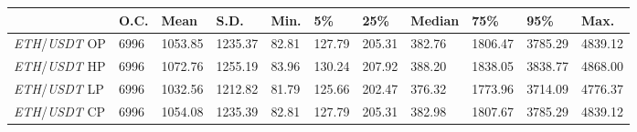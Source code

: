 \begin{tabular}{lllllllllll}
\toprule
 & \textbf{O.C.} & \textbf{Mean} & \textbf{S.D.} & \textbf{Min.} & \textbf{5\%} & \textbf{25\%} & \textbf{Median} & \textbf{75\%} & \textbf{95\%} & \textbf{Max.} \\
\midrule
\emph{ETH}/\emph{USDT} OP & 6996 & 1053.85 & 1235.37 & 82.81 & 127.79 & 205.31 & 382.76 & 1806.47 & 3785.29 & 4839.12 \\
\emph{ETH}/\emph{USDT} HP & 6996 & 1072.76 & 1255.19 & 83.96 & 130.24 & 207.92 & 388.20 & 1838.05 & 3838.77 & 4868.00 \\
\emph{ETH}/\emph{USDT} LP & 6996 & 1032.56 & 1212.82 & 81.79 & 125.66 & 202.47 & 376.32 & 1773.96 & 3714.09 & 4776.37 \\
\emph{ETH}/\emph{USDT} CP & 6996 & 1054.08 & 1235.39 & 82.81 & 127.79 & 205.31 & 382.98 & 1807.67 & 3785.29 & 4839.12 \\
\bottomrule
\end{tabular}
